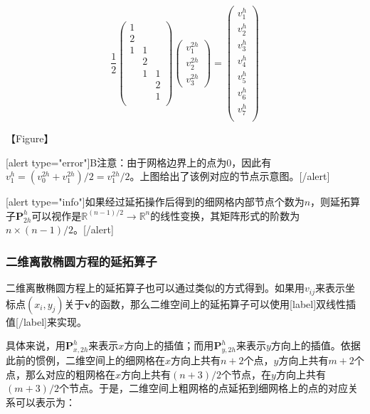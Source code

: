 \documentclass[12pt, UTF8, nofonts]{ctexart}
\begin{document}
\[
  \dfrac{1}{2}
  \begin{pmatrix}
    1 & & \\ 2 & & \\ 1 & 1 & \\ & 2 & \\ & 1 & 1 \\ & & 2 \\ & & 1 \\
  \end{pmatrix}
  \begin{pmatrix}
    v^{2h}_{1} \\ v^{2h}_{2} \\ v^{2h}_{3}
  \end{pmatrix} =
  \begin{pmatrix}
    v^{h}_{1} \\ v^{h}_{2} \\ v^{h}_{3} \\ v^{h}_{4} \\ v^{h}_{5} \\
    v^{h}_{6} \\ v^{h}_{7} \\
  \end{pmatrix}
\]

【Figure】

[alert type="error"]B注意：由于网格边界上的点为$0$，因此有$v^{h}_{1}=(v^{2h}_{0}+v^{2h}_{1})/2=v^{2h}_{1}/2$。上图给出了该例对应的节点示意图。[/alert]

[alert type="info"]如果经过延拓操作后得到的细网格内部节点个数为$n$，则延拓算子$\boldsymbol{P}_{2h}^{h}$可以视作是$\mathbb{R}^{(n-1)/2}\to\mathbb{R}^{n}$的线性变换，其矩阵形式的阶数为$n \times (n-1)/2$。[/alert]

\subsubsection*{二维离散椭圆方程的延拓算子}

二维离散椭圆方程上的延拓算子也可以通过类似的方式得到。如果用$v_{ij}$来表示坐标点$(x_i,y_j)$关于$\boldsymbol{v}$的函数，那么二维空间上的延拓算子可以使用[label]双线性插值[/label]来实现。

具体来说，用$\boldsymbol{P}_{x,2h}^{h}$来表示$x$方向上的插值；而用$\boldsymbol{P}_{y,2h}^{h}$来表示$y$方向上的插值。依据此前的惯例，二维空间上的细网格在$x$方向上共有$n+2$个点，$y$方向上共有$m+2$个点，那么对应的粗网格在$x$方向上共有$(n+3)/2$个节点，在$y$方向上共有$(m+3)/2$个节点。于是，二维空间上粗网格的点延拓到细网格上的点的对应关系可以表示为：
\end{document}
